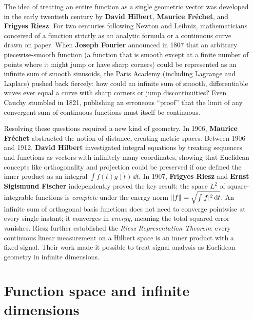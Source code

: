 \begin{historybox}
The idea of treating an entire function as a single geometric vector was developed
in the early twentieth century by \textbf{David Hilbert}, \textbf{Maurice Fréchet}, and
\textbf{Frigyes Riesz}. For two centuries following Newton and Leibniz, mathematicians conceived
of a function strictly as an analytic formula or a continuous curve drawn on paper. When
\textbf{Joseph Fourier} announced in 1807 that an arbitrary piecewise-smooth function (a function that is smooth except at a finite number of points where it might jump or have sharp corners) could be
represented as an infinite sum of smooth sinusoids, the Paris Academy (including Lagrange and
Laplace) pushed back fiercely: how could an infinite sum of smooth, differentiable waves
ever equal a curve with sharp corners or jump discontinuities? Even Cauchy stumbled in 1821,
publishing an erroneous ``proof'' that the limit of any convergent sum of continuous functions
must itself be continuous.

Resolving these questions required a new kind of geometry. In 1906, \textbf{Maurice Fréchet}
abstracted the notion of distance, creating metric spaces. Between 1906 and 1912, \textbf{David
Hilbert} investigated integral equations by treating sequences and functions as vectors with
infinitely many coordinates, showing that Euclidean concepts like orthogonality and projection
could be preserved if one defined the inner product as an integral $\int f(t)\overline{g(t)}\,\dd t$.
In 1907, \textbf{Frigyes Riesz} and \textbf{Ernst Sigismund Fischer} independently proved the
key result: the space $L^2$ of square-integrable functions is \emph{complete} under the
energy norm $\lVert f\rVert = \sqrt{\int \lvert f\rvert^2\,\mathrm{d} t}$. An infinite sum of orthogonal basis
functions does not need to converge pointwise at every single instant; it converges in
\emph{energy}, meaning the total squared error vanishes. Riesz further established the
\emph{Riesz Representation Theorem}: every continuous linear measurement on a Hilbert space is
an inner product with a fixed signal. Their work made it possible to treat signal
analysis as Euclidean geometry in infinite dimensions.
\end{historybox}

\section{Function space and infinite dimensions}
\label{ch03:l2}

